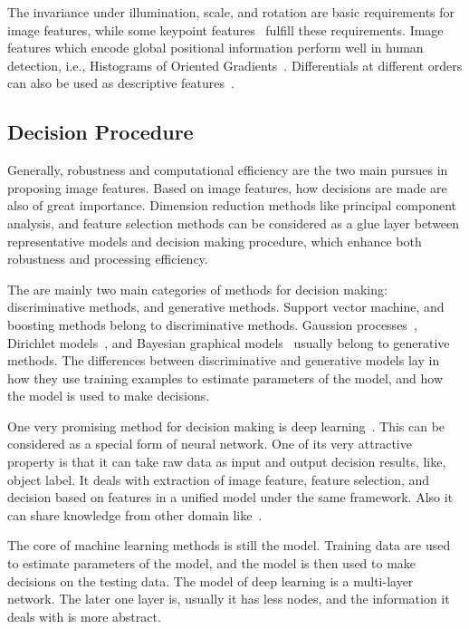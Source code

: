 The invariance under illumination, scale, and rotation are basic requirements for image features, while some keypoint features~\citep{ij2,o12,o14,o15,o2} fulfill these requirements. Image features which encode global positional information perform well in human detection, i.e., Histograms of Oriented
Gradients~\citep{ij4}. Differentials at different orders can also be used as descriptive features~\citep{regionc}.



\subsection{Decision Procedure}
Generally, robustness and computational efficiency are the two main pursues in proposing image features. Based on image features, how decisions are made are also of great importance. Dimension reduction methods like principal component analysis, and feature selection methods can be considered as a glue layer between representative models and decision making procedure, which enhance both robustness and processing efficiency.

The are mainly two main categories of methods for decision making: discriminative methods, and generative methods.
Support vector machine, and boosting methods belong to discriminative methods. Gaussion processes~\citep{gprocess}, Dirichlet models~\citep{lda,dp,hdp}, and Bayesian graphical models~\citep{bgm} usually belong to generative methods. The differences between discriminative and generative models lay in how they use training examples to estimate parameters of the model, and how the model is used to make decisions.

One very promising method for decision making is deep learning~\citep{dlearn}. This can be considered as a special form of neural network. One of its very attractive property is that it can take raw data as input and output decision results, like, object label. It deals with extraction of image feature, feature selection, and decision based on features in a unified model under the same framework. Also it can share knowledge from other domain like~\citep{tlsurvey}.

The core of machine learning methods is still the model. Training data are used to estimate  parameters of the model, and the model is then used to make decisions on the testing data. The model of deep learning is a multi-layer network. The later one layer is, usually it has less nodes, and the information it deals with is more abstract.

